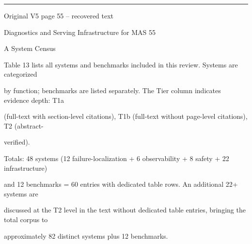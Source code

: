 \par\smallskip\noindent\rule{\textwidth}{0.4pt}\par{\sffamily\footnotesize Original V5 page 55 -- recovered text}\par\begin{flushleft}\footnotesize\ttfamily
\par\smallskip
\par\smallskip
\noindent Diagnostics and Serving Infrastructure for MAS 55\par
\par\smallskip
\par\smallskip
\par\smallskip
\noindent A System Census\par
\noindent Table 13 lists all systems and benchmarks included in this review. Systems are categorized\par
\noindent by function; benchmarks are listed separately. The Tier column indicates evidence depth: T1a\par
\noindent (full-text with section-level citations), T1b (full-text without page-level citations), T2 (abstract-\par
\noindent verified).\par
\noindent Totals: 48 systems (12 failure-localization + 6 observability + 8 safety + 22 infrastructure)\par
\noindent and 12 benchmarks = 60 entries with dedicated table rows. An additional 22+ systems are\par
\noindent discussed at the T2 level in the text without dedicated table entries, bringing the total corpus to\par
\noindent approximately 82 distinct systems plus 12 benchmarks.\par
\end{flushleft}
